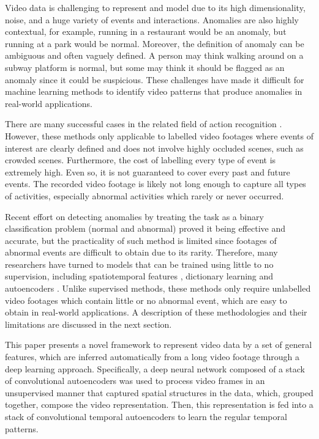 \documentclass[a4paper]{article}
\begin{document}
Video data is challenging to represent and model due to its high dimensionality, noise, and a huge variety of events and interactions. Anomalies are also highly contextual, for example, running in a restaurant would be an anomaly, but running at a park would be normal. Moreover, the definition of anomaly can be ambiguous and often vaguely defined. A person may think walking around on a subway platform is normal, but some may think it should be flagged as an anomaly since it could be suspicious. These challenges have made it difficult for machine learning methods to identify video patterns that produce anomalies in real-world applications.

There are many successful cases in the related field of action recognition \cite{tran2016,jia2014,ji2013,oneata2013}. However, these methods only applicable to labelled video footages where events of interest are clearly defined and does not involve highly occluded scenes, such as crowded scenes. Furthermore, the cost of labelling every type of event is extremely high. Even so, it is not guaranteed to cover every past and future events. The recorded video footage is likely not long enough to capture all types of activities, especially abnormal activities which rarely or never occurred.

Recent effort on detecting anomalies by treating the task as a binary classification problem (normal and abnormal) \cite{zhou2016} proved it being effective and accurate, but the practicality of such method is limited since footages of abnormal events are difficult to obtain due to its rarity. Therefore, many researchers have turned to models that can be trained using little to no supervision, including spatiotemporal features \cite{lu2013,zhao2011}, dictionary learning \cite{yen2013} and autoencoders \cite{sabokrou2015}. Unlike supervised methods, these methods only require unlabelled video footages which contain little or no abnormal event, which are easy to obtain in real-world applications. A description of these methodologies and their limitations are discussed in the next section. 

This paper presents a novel framework to represent video data by a set of general features, which are inferred automatically from a long video footage through a deep learning approach. Specifically, a deep neural network composed of a stack of convolutional autoencoders was used to process video frames in an unsupervised manner that captured spatial structures in the data, which, grouped together, compose the video representation. Then, this representation is fed into a stack of convolutional temporal autoencoders to learn the regular temporal patterns.
\end{document}
